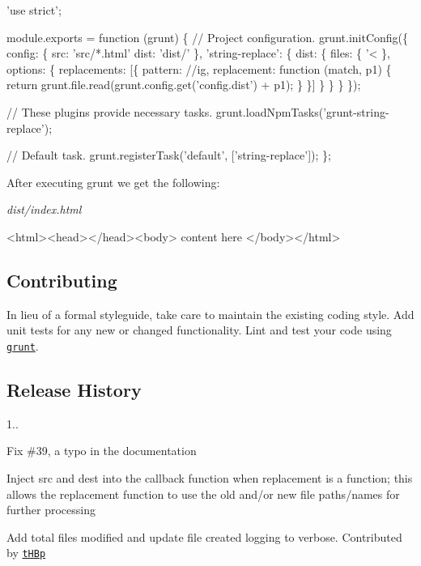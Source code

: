 \begin{DoxyCode}
'use strict';

module.exports = function (grunt) \{
  // Project configuration.
  grunt.initConfig(\{
    config: \{
      src: 'src/*.html'
      dist: 'dist/'
    \},
    'string-replace': \{
      dist: \{
        files: \{
          '<%
        \},
        options: \{
          replacements: [\{
            pattern: //ig,
            replacement: function (match, p1) \{
              return grunt.file.read(grunt.config.get('config.dist') + p1);
            \}
          \}]
        \}
      \}
    \}
  \});

  // These plugins provide necessary tasks.
  grunt.loadNpmTasks('grunt-string-replace');

  // Default task.
  grunt.registerTask('default', ['string-replace']);
\};
\end{DoxyCode}


After executing grunt we get the following\+:

{\itshape dist/index.\+html}


\begin{DoxyCode}
<html><head></head><body>
content here
</body></html>
\end{DoxyCode}


\subsection*{Contributing}

In lieu of a formal styleguide, take care to maintain the existing coding style. Add unit tests for any new or changed functionality. Lint and test your code using \href{http://gruntjs.com/}{\tt grunt}.

\subsection*{Release History}

1..
\begin{DoxyItemize}
\item Fix \#39, a typo in the documentation
\item Inject src and dest into the callback function when replacement is a function; this allows the replacement function to use the old and/or new file paths/names for further processing
\item Add total files modified and update file created logging to verbose. Contributed by \href{https://github.com/tHBp}{\tt t\+H\+Bp}
\end{DoxyItemize}

